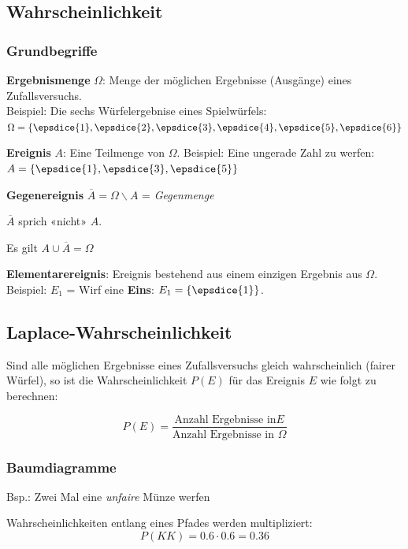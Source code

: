 \begin{multicols}{2}


\subsection*{Wahrscheinlichkeit}
\subsubsection*{Grundbegriffe}

\textbf{Ergebnismenge} $\Omega$: Menge der möglichen Ergebnisse
(Ausgänge) eines Zufallsversuchs.\\
Beispiel: Die sechs Würfelergebnise
eines Spielwürfels: $\Omega = \left\{\epsdice{1}, \epsdice{2}, \epsdice{3}, \epsdice{4}, \epsdice{5}, \epsdice{6}\right\}$

\textbf{Ereignis} $A$: Eine Teilmenge von $\Omega$. Beispiel: Eine
ungerade Zahl zu werfen: $A  = \left\{\epsdice{1}, \epsdice{3}, \epsdice{5}\right\}$

\textbf{Gegenereignis} $\overline{A} = \Omega \backslash A$ =
\textit{Gegenmenge}

$\overline{A}$ sprich «nicht» $A$.

Es gilt $A \cup \overline{A} = \Omega$

\textbf{Elementarereignis}: Ereignis bestehend aus einem einzigen
Ergebnis aus $\Omega$. Beispiel: $E_1$ = Wirf eine \textbf{Eins}: $E_1
= \left\{\epsdice{1}\right\}$.

\forceCB


\subsection*{Laplace-Wahrscheinlichkeit}
Sind alle möglichen Ergebnisse eines Zufallsversuchs gleich
wahrscheinlich (fairer Würfel), so ist die Wahrscheinlichkeit $P(E)$ für das Ereignis
$E$ wie folgt zu berechnen:

$$P(E) = \frac{\textrm{Anzahl Ergebnisse in
}E}{\textrm{Anzahl Ergebnisse in }\Omega}$$

\forceCB
\subsubsection*{Baumdiagramme}
Bsp.: Zwei Mal eine \textit{unfaire} Münze werfen

Wahrscheinlichkeiten {\color{farnFarbe}entlang} eines Pfades werden {\color{farnFarbe}multipliziert}:
$$P(KK) = 0.6\cdot0.6=0.36$$


\end{multicols}
